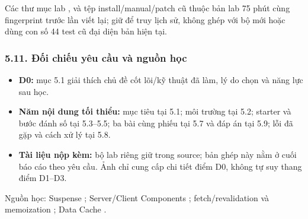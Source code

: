 \documentclass[12pt,a4paper]{extarticle}
\begin{document}
Các thư mục lab ,  và tệp install/manual/patch cũ thuộc bản lab 75 phút cùng fingerprint trước lần viết lại; giữ để truy lịch sử, không ghép với bộ mới hoặc dùng con số 44 test cũ đại diện bản hiện tại.

\subsubsection*{5.11. Đối chiếu yêu cầu và nguồn học}
\begin{itemize}[noitemsep]
    \item \textbf{D0:} mục 5.1 giải thích chủ đề cốt lõi/kỹ thuật đã làm, lý do chọn và năng lực sau học.
    \item \textbf{Năm nội dung tối thiểu:} mục tiêu tại 5.1; môi trường tại 5.2; starter và bước đánh số tại 5.3--5.5; ba bài cùng phiếu tại 5.7 và đáp án tại 5.9; lỗi đã gặp và cách xử lý tại 5.8.
    \item \textbf{Tài liệu nộp kèm:} bộ lab riêng giữ trong source; bản ghép này nằm ở cuối báo cáo theo yêu cầu. Ảnh chỉ cung cấp chi tiết điểm D0, không tự suy thang điểm D1--D3.
\end{itemize}
Nguồn học: Suspense \cite{nextjs_fetching}; Server/Client Components \cite{nextjs_boundary}; fetch/revalidation và memoization \cite{nextjs_fetch_api}; Data Cache \cite{nextjs_cache_model}.

\endgroup
\end{document}
